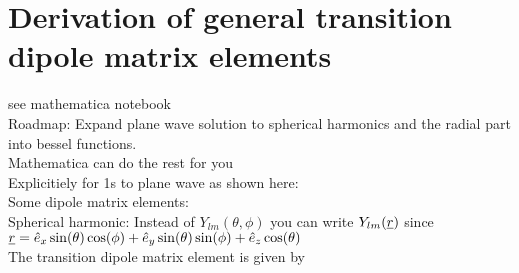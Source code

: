 \section{Derivation of general transition dipole matrix elements}
see mathematica notebook\\
Roadmap: Expand plane wave solution to spherical harmonics and the radial part into bessel functions.\\
Mathematica can do the rest for you\\
Explicitiely for 1s to plane wave as shown here:\\
Some dipole matrix elements:\\
Spherical harmonic: Instead of $Y_{lm}(\theta, \phi)$ you can write $Y_{lm}(\underline{r})$ since $\underline{r}=\hat{e}_x \sin(\theta)\cos(\phi)+\hat{e}_y\sin(\theta)\sin(\phi)+\hat{e}_z\cos(\theta)$\\
The transition dipole matrix element is given by
